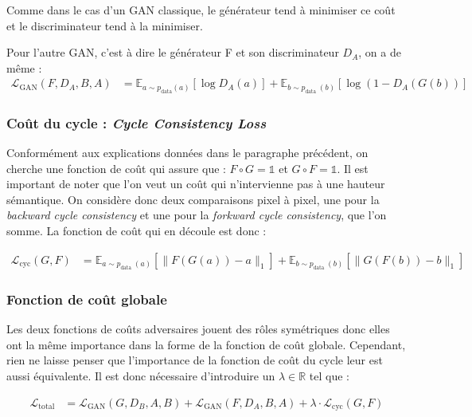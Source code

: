Comme dans le cas d'un GAN classique, le générateur tend à minimiser ce coût et le discriminateur tend à la minimiser.

Pour l'autre GAN, c'est à dire le générateur F et son discriminateur $D_A$, on a de même : $$\begin{aligned}
\mathcal{L}_{\mathrm{GAN}}\left(F, D_{A}, B, A\right) &=\mathbb{E}_{a \sim p_{\mathrm{data}}(a)}\left[\log D_{A}(a)\right] +\mathbb{E}_{b \sim p_{\text {data }}(b)}\left[\log \left(1-D_{A}(G(b))\right]\right.
\end{aligned}$$

\subsubsection{Coût du cycle : \textit{Cycle Consistency Loss}}

Conformément aux explications données dans le paragraphe précédent, on cherche une fonction de coût qui assure que : $ F \circ G = \mathbb{1} $ et $ G \circ F = \mathbb{1} $. Il est important de noter que l'on veut un coût qui n'intervienne pas à une hauteur sémantique. On considère donc deux comparaisons pixel à pixel, une pour la \textit{backward cycle consistency} et une pour la \textit{forkward cycle consistency}, que l'on somme. La fonction de coût qui en découle est donc :

$$\begin{aligned}
\mathcal{L}_{\mathrm{cyc}}(G, F) &=\mathbb{E}_{a \sim p_{\text {data }}(a)}\left[\|F(G(a))-a\|_{1}\right] +\mathbb{E}_{b \sim p_{\text {data }}(b)}\left[\|G(F(b))-b\|_{1}\right]
\end{aligned}$$

\subsubsection{Fonction de coût globale}

Les deux fonctions de coûts adversaires jouent des rôles symétriques donc elles ont la même importance dans la forme de la fonction de coût globale. Cependant, rien ne laisse penser que l'importance de la fonction de coût du cycle leur est aussi équivalente. Il est donc nécessaire d'introduire un $\lambda \in \mathbb{R}$ tel que :

$$\begin{aligned}
\mathcal{L}_{\text{total}} &=\mathcal{L}_{\mathrm{GAN}}\left(G, D_{B}, A, B\right) +\mathcal{L}_{\mathrm{GAN}}\left(F, D_{A}, B, A\right) +\lambda \cdot \mathcal{L}_{\mathrm{cyc}}(G, F)
\end{aligned}$$

